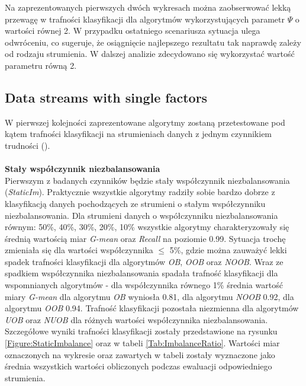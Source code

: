 \noindent Na zaprezentowanych pierwszych dwóch wykresach można zaobserwować lekką przewagę w trafności klasyfikacji dla algorytmów wykorzystujących parametr $\Psi$ o wartości równej 2. W przypadku ostatniego scenariusza sytuacja ulega odwróceniu, co sugeruje, że osiągnięcie najlepszego rezultatu tak naprawdę zależy od rodzaju strumienia. W dalszej analizie zdecydowano się wykorzystać wartość parametru równą 2.

\newpage

\subsection{Data streams with single factors}

\noindent W pierwszej kolejności zaprezentowane algorytmy zostaną przetestowane pod kątem trafności klasyfikacji na strumieniach danych z jednym czynnikiem trudności ().\\\\
\textbf{Stały współczynnik niezbalansowania}\\

\noindent Pierwszym z badanych czynników będzie stały współczynnik niezbalansowania (\textit{StaticIm}). Praktycznie wszystkie algorytmy radziły sobie bardzo dobrze z klasyfikacją danych pochodzących ze strumieni o stałym współczynniku niezbalansowania. Dla strumieni danych o współczynniku niezbalansowania równym: 50\%, 40\%, 30\%, 20\%, 10\% wszystkie algorytmy charakteryzowały się średnią wartością miar \textit{G-mean} oraz \textit{Recall} na poziomie 0.99. Sytuacja trochę zmieniała się dla wartości współczynnika $\leq$ 5\%, gdzie można zauważyć lekki spadek trafności klasyfikacji dla algorytmów \textit{OB}, \textit{OOB} oraz \textit{NOOB}. Wraz ze spadkiem współczynnika niezbalansowania spadała trafność klasyfikacji dla wspomnianych algorytmów - dla współczynnika równego 1\% średnia wartość miary \textit{G-mean} dla algorytmu \textit{OB} wyniosła 0.81, dla algorytmu \textit{NOOB} 0.92, dla algorytmu \textit{OOB} 0.94. Trafność klasyfikacji pozostała niezmienna dla algorytmów \textit{UOB} oraz \textit{NUOB} dla różnych wartości współczynnika niezbalansowania. Szczegółowe wyniki trafności klasyfikacji zostały przedstawione na rysunku \ref{Figure:StaticImbalance} oraz w tabeli \ref{Tab:ImbalanceRatio}. Wartości miar oznaczonych na wykresie oraz zawartych w tabeli zostały wyznaczone jako średnia wszystkich wartości obliczonych podczas ewaluacji odpowiedniego strumienia.\\\\


